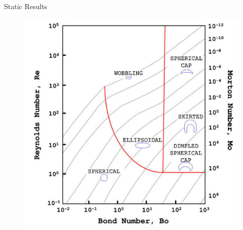 \documentclass[8pt]{beamer}
\begin{document}
\begin{frame}[t]{Static Results}
		\begin{figure}
			\centering
			\includegraphics[scale=0.15]{pics/shapeRegimes.png}
		\end{figure}

	\end{frame}
\end{document}
